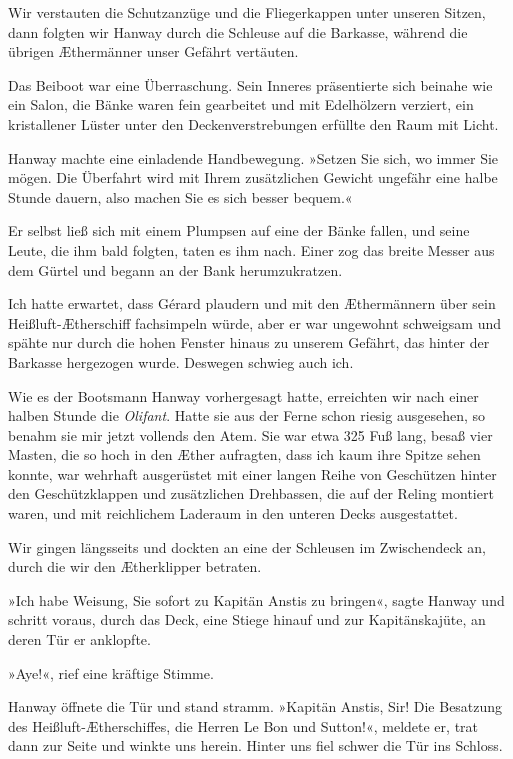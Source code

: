 Wir verstauten die Schutzanzüge und die Fliegerkappen unter unseren
Sitzen, dann folgten wir Hanway durch die Schleuse auf die
Barkasse, während die übrigen Æthermänner unser Gefährt vertäuten.

Das Beiboot war eine Überraschung. Sein Inneres präsentierte sich
beinahe wie ein Salon, die Bänke waren fein gearbeitet und mit
Edelhölzern verziert, ein kristallener Lüster unter den
Deckenverstrebungen erfüllte den Raum mit Licht.

Hanway machte eine einladende Handbewegung. »Setzen Sie sich, wo
immer Sie mögen. Die Überfahrt wird mit Ihrem zusätzlichen Gewicht
ungefähr eine halbe Stunde dauern, also machen Sie es sich besser
bequem.«

Er selbst ließ sich mit einem Plumpsen auf eine der Bänke fallen,
und seine Leute, die ihm bald folgten, taten es ihm nach. Einer zog
das breite Messer aus dem Gürtel und begann an der Bank
herumzukratzen.

Ich hatte erwartet, dass Gérard plaudern und mit den Æthermännern
über sein Heißluft-Ætherschiff fachsimpeln würde, aber er war
ungewohnt schweigsam und spähte nur durch die hohen Fenster hinaus
zu unserem Gefährt, das hinter der Barkasse hergezogen wurde.
Deswegen schwieg auch ich.

\bigpar

Wie es der Bootsmann Hanway vorhergesagt hatte, erreichten wir nach
einer halben Stunde die \emph{Olifant}. Hatte sie aus der Ferne
schon riesig ausgesehen, so benahm sie mir jetzt vollends den Atem.
Sie war etwa 325 Fuß lang, besaß vier Masten, die so hoch in den
Æther aufragten, dass ich kaum ihre Spitze sehen konnte, war
wehrhaft ausgerüstet mit einer langen Reihe von Geschützen hinter
den Geschützklappen und zusätzlichen Drehbassen, die auf der Reling
montiert waren, und mit reichlichem Laderaum in den unteren Decks
ausgestattet.

Wir gingen längsseits und dockten an eine der Schleusen im
Zwischendeck an, durch die wir den Ætherklipper betraten.

»Ich habe Weisung, Sie sofort zu Kapitän Anstis zu bringen«, sagte
Hanway und schritt voraus, durch das Deck, eine Stiege hinauf und
zur Kapitänskajüte, an deren Tür er anklopfte.

»Aye!«, rief eine kräftige Stimme.

Hanway öffnete die Tür und stand stramm. »Kapitän Anstis, Sir! Die
Besatzung des Heißluft-Ætherschiffes, die Herren Le Bon und
Sutton!«, meldete er, trat dann zur Seite und winkte uns herein.
Hinter uns fiel schwer die Tür ins Schloss.

